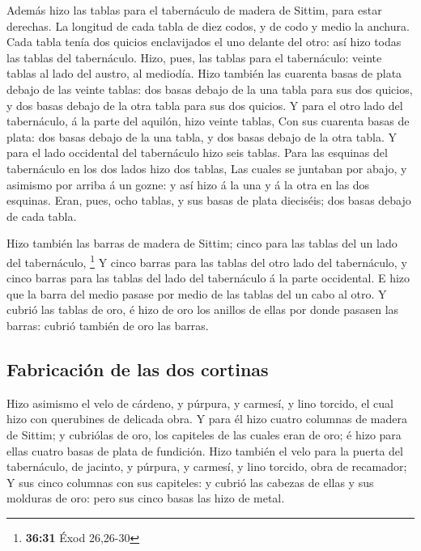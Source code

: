  Además hizo las tablas para el tabernáculo de madera de
Sittim, para estar derechas.  La longitud de cada tabla de
diez codos, y de codo y medio la anchura.  Cada tabla tenía
dos quicios enclavijados el uno delante del otro: así hizo todas las
tablas del tabernáculo.  Hizo, pues, las tablas para el
tabernáculo: veinte tablas al lado del austro, al mediodía.
 Hizo también las cuarenta basas de plata debajo de las
veinte tablas: dos basas debajo de la una tabla para sus dos quicios, y
dos basas debajo de la otra tabla para sus dos quicios.  Y
para el otro lado del tabernáculo, á la parte del aquilón, hizo veinte
tablas,  Con sus cuarenta basas de plata: dos basas debajo
de la una tabla, y dos basas debajo de la otra tabla.  Y
para el lado occidental del tabernáculo hizo seis tablas. 
Para las esquinas del tabernáculo en los dos lados hizo dos tablas,
 Las cuales se juntaban por abajo, y asimismo por arriba á
un gozne: y así hizo á la una y á la otra en las dos esquinas.
 Eran, pues, ocho tablas, y sus basas de plata dieciséis;
dos basas debajo de cada tabla.

 Hizo también las barras de madera de Sittim; cinco para
las tablas del un lado del tabernáculo, \footnote{\textbf{36:31} Éxod
  26,26-30}  Y cinco barras para las tablas del otro lado
del tabernáculo, y cinco barras para las tablas del lado del tabernáculo
á la parte occidental.  E hizo que la barra del medio
pasase por medio de las tablas del un cabo al otro.  Y
cubrió las tablas de oro, é hizo de oro los anillos de ellas por donde
pasasen las barras: cubrió también de oro las barras.

\hypertarget{fabricaciuxf3n-de-las-dos-cortinas}{%
\subsection{Fabricación de las dos
cortinas}\label{fabricaciuxf3n-de-las-dos-cortinas}}

 Hizo asimismo el velo de cárdeno, y púrpura, y carmesí, y
lino torcido, el cual hizo con querubines de delicada obra.
 Y para él hizo cuatro columnas de madera de Sittim; y
cubriólas de oro, los capiteles de las cuales eran de oro; é hizo para
ellas cuatro basas de plata de fundición.  Hizo también el
velo para la puerta del tabernáculo, de jacinto, y púrpura, y carmesí, y
lino torcido, obra de recamador;  Y sus cinco columnas con
sus capiteles: y cubrió las cabezas de ellas y sus molduras de oro: pero
sus cinco basas las hizo de metal.

